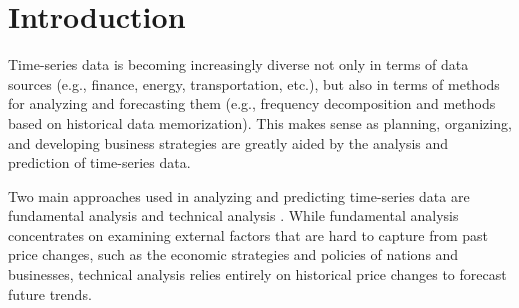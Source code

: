 \documentclass[a4paper,fleqn]{cas-sc}
\begin{document}
\maketitle


\section{Introduction}

Time-series data is becoming increasingly diverse not only in terms of data sources (e.g., finance, energy, transportation, etc.), but also in terms of methods for analyzing and forecasting them (e.g., frequency decomposition and methods based on historical data memorization). This makes sense as planning, organizing, and developing business strategies are greatly aided by the analysis and prediction of time-series data.

\vspace{1mm}

Two main approaches used in analyzing and predicting time-series data are fundamental analysis and technical analysis \cite{ayitey2023forex}. While fundamental analysis concentrates on examining external factors that are hard to capture from past price changes, such as the economic strategies and policies of nations and businesses, technical analysis relies entirely on historical price changes to forecast future trends.

\vspace{1mm}



\end{document}
